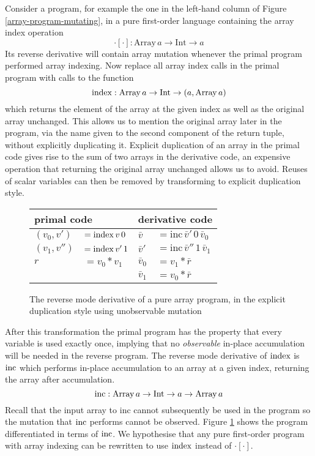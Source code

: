 \documentclass[12pt]{article}
\begin{document}
Consider a program, for example the one in the left-hand column of
Figure \ref{array-program-mutating}, in a pure first-order language
containing the array index operation
\[
\cdot[\cdot] : \mathrm{Array} \, a \to \mathrm{Int} \to a
\]
Its reverse derivative will contain array mutation whenever the primal
program performed array indexing.  Now replace all array index calls
in the primal program with calls to the function
\[
\mathrm{index} : \mathrm{Array} \, a \to \mathrm{Int} \to (a, \mathrm{Array}
\, a)
\]
which returns the element of the array at the given index as well as
the original array unchanged.  This allows us to mention the original
array later in the program, via the name given to the second component
of the return tuple, without explicitly duplicating it.  Explicit
duplication of an array in the primal code gives rise to the sum of
two arrays in the derivative code, an expensive operation that
returning the original array unchanged allows us to avoid.  Reuses of
scalar variables can then be removed by
transforming to explicit duplication style.

\begin{figure}[t]
\center
\begin{tabular}[t]{ll|ll}
  \multicolumn{2}{l|}{primal code}
  &
  \multicolumn{2}{l}{derivative code}
  \\

  \hline

  $(v_0, v')$ & $ = \mathrm{index} \, v \, 0$
  &
  $\bar{v}$ & $ = \mathrm{inc} \, \bar{v}' \, 0 \, \bar{v}_0$
  \\
  
  $(v_1, v'')$ & $ = \mathrm{index} \, v' \, 1$
  &
  $\bar{v}'$ & $ = \mathrm{inc} \, \bar{v}'' \, 1 \, \bar{v}_1$
  \\

  $r$ & $ = v_0 * v_1$
  &
  $\bar{v}_0$ & $ = v_1 * \bar{r}$
  \\

  & &
  $\bar{v}_1$ & $ = v_0 * \bar{r}$
  \\
\end{tabular}
\caption{\label{array-program-dup} The reverse mode derivative of
  a pure array program, in the explicit duplication style using
  unobservable mutation}
\end{figure}

After this transformation the primal program has the property that
every variable is used exactly once, implying that no
\emph{observable} in-place accumulation will be needed in the reverse
program.  The reverse mode derivative of $\mathrm{index}$ is $\mathrm{inc}$ which
performs in-place accumulation to an array at a given index, returning the array
after accumulation.
\[
\mathrm{inc} : \mathrm{Array} \, a \to \mathrm{Int} \to a \to \mathrm{Array}
\, a
\]
Recall that the input array to $\textrm{inc}$
cannot subsequently be used in the program so the mutation that
$\mathrm{inc}$ performs cannot be observed.  Figure \ref{array-program-dup}
shows the program differentiated in terms of $\mathrm{inc}$.
We hypothesise that any pure first-order program with array indexing
can be rewritten to use $\mathrm{index}$ instead of $\cdot[\cdot]$.
\end{document}
